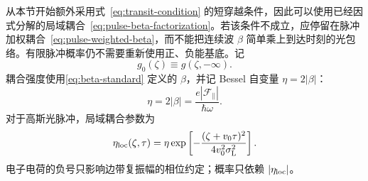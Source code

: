 从本节开始额外采用式~\cref{eq:transit-condition} 的短穿越条件，因此可以使用已经因式分解的局域耦合~\cref{eq:pulse-beta-factorization}。若该条件不成立，应停留在脉冲加权耦合~\cref{eq:pulse-weighted-beta}，而不能把连续波 $\beta$ 简单乘上到达时刻的光包络。有限脉冲概率仍不需要重新使用正、负能基底。记
\[
g_0(\zeta)\equiv g(\zeta,-\infty).
\]
耦合强度使用\cref{eq:beta-standard} 定义的 $\beta$，并记 Bessel 自变量 $\eta=2|\beta|$：
\[
\eta=2|\beta|=\frac{e|\mathcal F_{\parallel}|}{\hbar\omega}.
\]
对于高斯光脉冲，局域耦合参数为
\begin{equation}
\eta_{\rm loc}(\zeta,\tau)
=
\eta
\exp\left[
-\frac{(\zeta+v_0\tau)^2}
{4v_0^2\sigma_{\mathrm L}^2}
\right].
\label{eq:eta-local}
\end{equation}
电子电荷的负号只影响边带复振幅的相位约定；概率只依赖 $|\eta_{\rm loc}|$。

